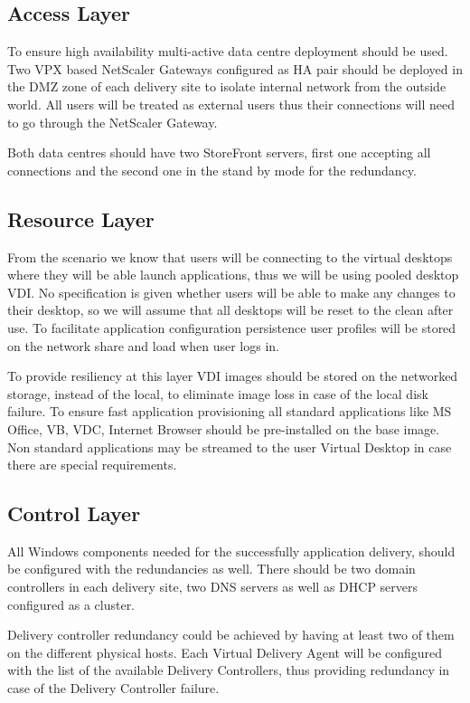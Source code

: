 \documentclass[a4paper]{article}
\begin{document}
	\subsection{Access Layer}
	To ensure high availability multi-active data centre deployment should be used. Two VPX based NetScaler Gateways configured as HA pair should be deployed in the DMZ zone of each delivery site to isolate internal network from the outside world. All users will be treated as external users thus their connections will need to go through the NetScaler Gateway.
	
	Both data centres should have two StoreFront servers, first one accepting all connections and the second one in the stand by mode for the redundancy.    
	\subsection{Resource Layer}
	From the scenario we know that users will be connecting to the virtual desktops where they will be able launch applications, thus we will be using pooled desktop VDI. No specification is given whether users will be able to make any changes to their desktop, so we will assume that all desktops will be reset to the clean after use. To facilitate application configuration persistence user profiles will be stored on the network share and load when user logs in.
	
	To provide resiliency at this layer VDI images should be stored on the networked storage, instead of the local, to eliminate image loss in case of the local disk failure. To ensure fast application provisioning all standard applications like MS Office, VB, VDC, Internet Browser should be pre-installed on the base image. Non standard applications may be streamed to the user Virtual Desktop in case there are special requirements.
	\subsection{Control Layer}
	All Windows components needed for the successfully application delivery, should be configured with the redundancies as well. There should be two domain controllers in each delivery site, two DNS servers as well as DHCP servers configured as a cluster.
	
	Delivery controller redundancy could be achieved by having at least two of them on the different physical hosts. Each Virtual Delivery Agent will be configured with the list of the available Delivery Controllers, thus providing redundancy in case of the Delivery Controller failure.
	
\end{document}
